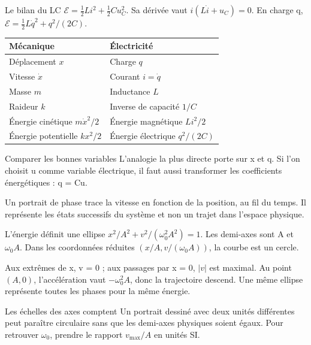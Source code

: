 \begin{loi}{Le bilan du LC}
$\mathcal E=\tfrac12Li^2+\tfrac12Cu_C^2$. Sa dérivée vaut $i(L\dot i+u_C)=0$. En charge q, $\mathcal E=\tfrac12L\dot q^2+q^2/(2C)$.
\end{loi}
\begin{tabularx}{\linewidth}{@{}Y Y@{}}\toprule
Mécanique & Électricité\\\midrule
Déplacement $x$ & Charge $q$\\
Vitesse $\dot x$ & Courant $i=\dot q$\\
Masse $m$ & Inductance $L$\\
Raideur $k$ & Inverse de capacité $1/C$\\
Énergie cinétique $m\dot x^2/2$ & Énergie magnétique $Li^2/2$\\
Énergie potentielle $kx^2/2$ & Énergie électrique $q^2/(2C)$\\\bottomrule
\end{tabularx}
\begin{methode}{Comparer les bonnes variables}
L’analogie la plus directe porte sur x et q. Si l’on choisit u comme variable électrique, il faut aussi transformer les coefficients énergétiques : q = Cu.
\end{methode}


Un portrait de phase trace la vitesse en fonction de la position, au fil du temps. Il représente les états successifs du système et non un trajet dans l’espace physique.
\begin{loi}{L’énergie définit une ellipse}
$x^2/A^2+v^2/(\omega_0^2A^2)=1$. Les demi-axes sont A et $\omega_0A$. Dans les coordonnées réduites $(x/A,v/(\omega_0A))$, la courbe est un cercle.
\end{loi}
Aux extrêmes de x, v = 0 ; aux passages par x = 0, $|v|$ est maximal. Au point $(A,0)$, l’accélération vaut $-\omega_0^2A$, donc la trajectoire descend. Une même ellipse représente toutes les phases pour la même énergie.
\begin{piege}{Les échelles des axes comptent}
Un portrait dessiné avec deux unités différentes peut paraître circulaire sans que les demi-axes physiques soient égaux. Pour retrouver $\omega_0$, prendre le rapport $v_{\max}/A$ en unités SI.
\end{piege}


